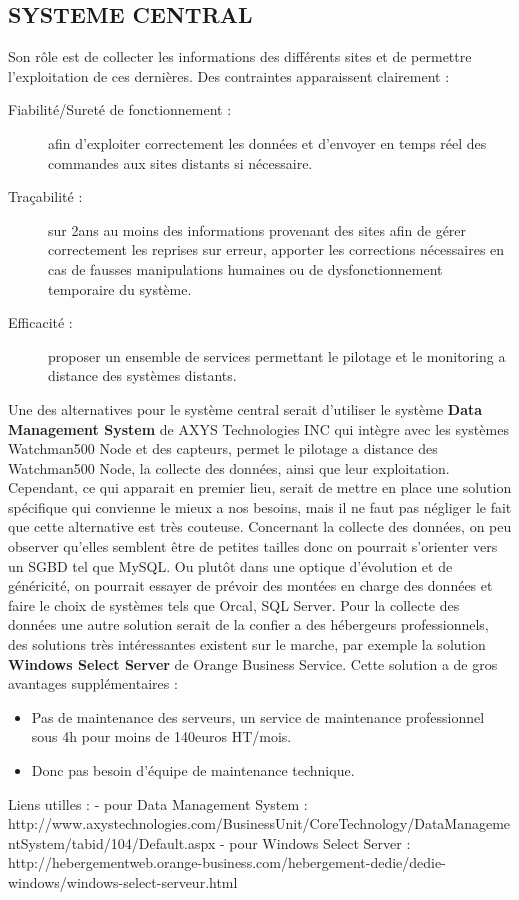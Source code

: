 \documentclass{article}
\begin{document}
\subsection{SYSTEME CENTRAL}
		Son rôle est de collecter les informations des différents sites et de permettre l'exploitation de ces dernières.
		Des contraintes apparaissent clairement : 
		\begin{description}
				\item[Fiabilité/Sureté de fonctionnement :] afin d'exploiter correctement les données et d'envoyer en temps réel des commandes aux sites distants si nécessaire.
				\item[Traçabilité :] sur 2ans au moins des informations provenant des sites afin de gérer correctement les reprises sur erreur, apporter les corrections nécessaires en cas de fausses manipulations humaines ou de dysfonctionnement temporaire du système.
				\item[Efficacité :] proposer un ensemble de services permettant le pilotage et le monitoring a distance des systèmes distants.
		\end{description}

		Une des alternatives pour le système central serait d'utiliser le système \textbf{Data Management System} de AXYS Technologies INC qui intègre avec les systèmes Watchman500 Node et des capteurs, permet le pilotage a distance des Watchman500 Node, la collecte des données, ainsi que leur exploitation.
		Cependant, ce qui apparait en premier lieu, serait de mettre en place une solution spécifique qui convienne le mieux a nos besoins, mais il ne faut pas négliger le fait que cette alternative est très couteuse.
		Concernant la collecte des données, on peu observer qu'elles semblent être de petites tailles donc on pourrait s'orienter vers un SGBD tel que MySQL. Ou plutôt dans une optique d'évolution et de généricité, on pourrait essayer de prévoir des montées en charge des données et faire le choix de systèmes tels que Orcal, SQL Server.
		Pour la collecte des données une autre solution serait de la confier a des hébergeurs professionnels, des solutions très intéressantes existent sur le marche, par exemple la solution \textbf{Windows Select Server} de Orange Business Service. Cette solution a de gros avantages supplémentaires :
		\begin{itemize}
				\item Pas de maintenance des serveurs, un service de maintenance professionnel sous 4h pour moins de 140euros HT/mois.
				\item Donc pas besoin d'équipe de maintenance technique.
		\end{itemize}

Liens utilles : 
- pour Data Management System : http://www.axystechnologies.com/BusinessUnit/CoreTechnology/DataManagementSystem/tabid/104/Default.aspx
- pour Windows Select Server : http://hebergementweb.orange-business.com/hebergement-dedie/dedie-windows/windows-select-serveur.html
\end{document}
